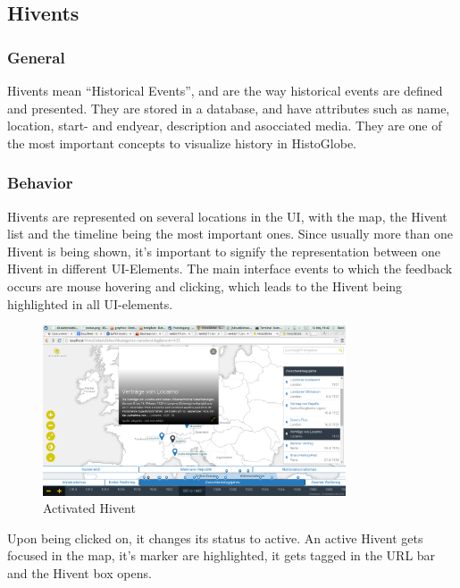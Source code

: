 \subsection{Hivents} %
\label{sec:hivents}

\subsubsection{General} %
\label{sub:general}
Hivents mean ``Historical Events'', and are the way historical events are defined and presented. They are stored in a database, and have attributes such as name, location, start- and endyear, description and asocciated media.
They are one of the most important concepts to visualize history in HistoGlobe.

\subsubsection{Behavior} %
\label{sub:behaviour}
Hivents are represented on several locations in the UI, with the map, the Hivent list and the timeline being the most important ones.
Since usually more than one Hivent is being shown, it's important to signify the representation between one Hivent in different UI-Elements.
The main interface events to which the feedback occurs are mouse hovering and clicking, which leads to the Hivent being highlighted in all UI-elements.

\begin{figure}[H]
  \begin{center}
    \includegraphics[width=0.8\textwidth]{graphics/activated_hivent.png}
  \end{center}
  \caption{Activated Hivent}
  \label{fig:activated_hivent}
\end{figure}

Upon being clicked on, it changes its status to active. An active Hivent gets focused in the map, it's marker are highlighted, it gets tagged in the URL bar and the Hivent box opens.

